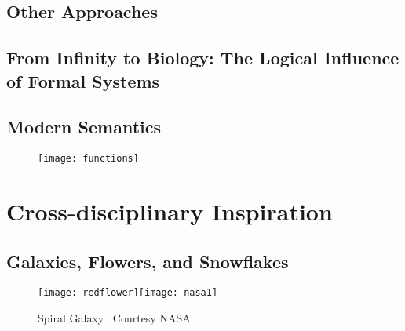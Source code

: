 \documentclass[11pt]{book}%
\theoremstyle{plain}
\numberwithin{equation}{section}
\theoremstyle{definition}
\newtheorem{phrase string}{Phrase String}
\begin{document}
\chapter{Other Approaches}%
 
  
\chapter[Infinity to Biology]{From Infinity to Biology: The Logical Influence of Formal Systems}\label{infinitybiology}%


\chapter{Modern Semantics}%
\vspace{0.5cm}
    \begin{wrapfigure}{R}{0.7\textwidth}
         \vspace{-1cm}
        \begin{center}
        \texttt{[image: functions]}
        \end{center}
         \vspace{-1cm}
    \end{wrapfigure}









\part{Cross-disciplinary Inspiration}%
\chapter{Galaxies, Flowers, and Snowflakes}\label{galaxiesflowers}%
\begin{wrapfigure}{R}{0.7\textwidth}
         \vspace{-1cm}
        \begin{center}
        \texttt{[image: redflower]}\texttt{[image: nasa1]}
        \caption{Spiral Galaxy \  \scriptsize Courtesy NASA}
        \end{center}
         \vspace{-1cm}
    \end{wrapfigure}
    
\end{document}
